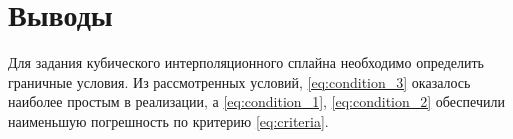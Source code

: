 \documentclass[12pt, a4paper]{article}
\begin{document}
\section{Выводы}

Для задания кубического интерполяционного сплайна необходимо 
определить граничные условия. Из рассмотренных условий, \eqref{eq:condition_3} 
оказалось наиболее простым в реализации, а \eqref{eq:condition_1}, \eqref{eq:condition_2}
обеспечили наименьшую погрешность по критерию \eqref{eq:criteria}.
\end{document}
